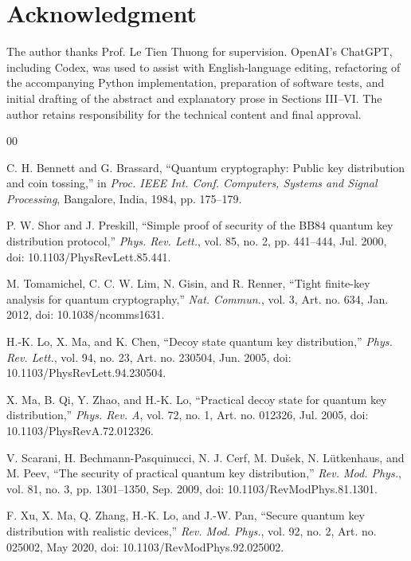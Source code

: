 \documentclass[conference]{IEEEtran}
\begin{document}
\section*{Acknowledgment}

The author thanks Prof. Le Tien Thuong for supervision. OpenAI's ChatGPT,
including Codex, was used to assist with English-language editing, refactoring
of the accompanying Python implementation, preparation of software tests, and
initial drafting of the abstract and explanatory prose in Sections III--VI.
The author retains responsibility for the technical content and final approval.

\balance
\begin{thebibliography}{00}

C. H. Bennett and G. Brassard, ``Quantum cryptography: Public key distribution
and coin tossing,'' in \emph{Proc. IEEE Int. Conf. Computers, Systems and
Signal Processing}, Bangalore, India, 1984, pp. 175--179.

P. W. Shor and J. Preskill, ``Simple proof of security of the BB84 quantum key
distribution protocol,'' \emph{Phys. Rev. Lett.}, vol. 85, no. 2,
pp. 441--444, Jul. 2000, doi: 10.1103/PhysRevLett.85.441.

M. Tomamichel, C. C. W. Lim, N. Gisin, and R. Renner, ``Tight finite-key
analysis for quantum cryptography,'' \emph{Nat. Commun.}, vol. 3,
Art. no. 634, Jan. 2012, doi: 10.1038/ncomms1631.

H.-K. Lo, X. Ma, and K. Chen, ``Decoy state quantum key distribution,''
\emph{Phys. Rev. Lett.}, vol. 94, no. 23, Art. no. 230504, Jun. 2005,
doi: 10.1103/PhysRevLett.94.230504.

X. Ma, B. Qi, Y. Zhao, and H.-K. Lo, ``Practical decoy state for quantum key
distribution,'' \emph{Phys. Rev. A}, vol. 72, no. 1, Art. no. 012326,
Jul. 2005, doi: 10.1103/PhysRevA.72.012326.

V. Scarani, H. Bechmann-Pasquinucci, N. J. Cerf, M. Du\v{s}ek,
N. L\"utkenhaus, and M. Peev, ``The security of practical quantum key
distribution,'' \emph{Rev. Mod. Phys.}, vol. 81, no. 3, pp. 1301--1350,
Sep. 2009, doi: 10.1103/RevModPhys.81.1301.

F. Xu, X. Ma, Q. Zhang, H.-K. Lo, and J.-W. Pan, ``Secure quantum key
distribution with realistic devices,'' \emph{Rev. Mod. Phys.}, vol. 92,
no. 2, Art. no. 025002, May 2020,
doi: 10.1103/RevModPhys.92.025002.

\end{thebibliography}
\end{document}
